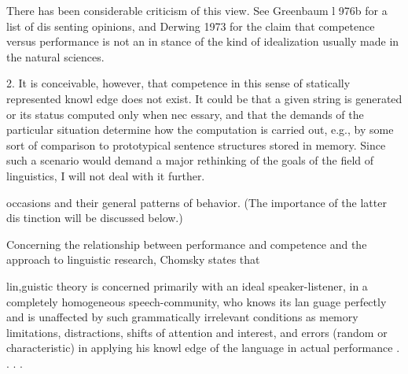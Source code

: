 \begin{listWWNumlxvileveli}
\item 
\setcounter{listWWNumlxvilevelii}{1}
\begin{listWWNumlxvilevelii}
\item 
\setcounter{listWWNumlxvileveliii}{0}
\begin{listWWNumlxvileveliii}
\item 
\begin{styleStandard}
There has been considerable criticism of this view. See Greenbaum l 976b for a list of dis\- senting opinions, and Derwing 1973 for the claim that competence versus performance is not an in\- stance of the kind of idealization usually made in the natural sciences.
\end{styleStandard}


\end{listWWNumlxvileveliii}
\end{listWWNumlxvilevelii}
\end{listWWNumlxvileveli}
\begin{styleStandard}
2. It is conceivable, however, that competence in this sense of statically represented knowl\- edge does not exist. It could be that a given string is generated or its status computed only when nec\- essary, and that the demands of the particular situation determine how the computation is carried out, e.g., by some sort of comparison to prototypical sentence structures stored in memory. Since such a scenario would demand a major rethinking of the goals of the field of linguistics, I will not deal with it further.
\end{styleStandard}


\clearpage\setcounter{page}{1}\begin{styleStandard}
occasions and their general patterns of behavior. (The importance of the latter dis\- tinction will be discussed below.)
\end{styleStandard}


\begin{styleStandard}
Concerning the relationship between performance and competence and the approach to linguistic research, Chomsky states that
\end{styleStandard}


\begin{styleStandard}
lin,guistic theory is concerned primarily with an ideal speaker-listener, in a completely homogeneous speech-community, who knows its lan\- guage perfectly and is unaffected by such grammatically irrelevant conditions as memory limitations, distractions, shifts of attention and interest, and errors (random or characteristic) in applying his knowl\- edge of the language in actual performance . . . .
\end{styleStandard}


